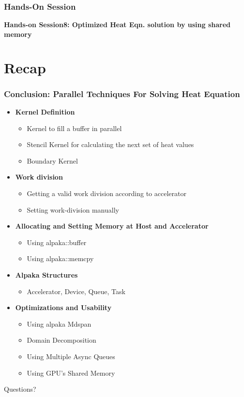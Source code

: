 \documentclass[9pt]{beamer}
\begin{document}
\begin{frame}
\frametitle{Hands-On Session}
\begin{center}
      \Huge \textbf{Hands-on Session8: Optimized Heat Eqn. solution by using shared memory}
  \end{center}
\end{frame}


\section{Recap}

\begin{frame}
\frametitle{Conclusion: Parallel Techniques For Solving Heat Equation}
\begin{itemize}
    \item \textbf{Kernel Definition}
    \begin{itemize}
        \item Kernel to fill a buffer in parallel
        \item Stencil Kernel for calculating the next set of heat values
        \item Boundary Kernel
    \end{itemize}
    \item \textbf{Work division}
    \begin{itemize}
        \item Getting a valid work division according to accelerator
        \item Setting work-division manually
    \end{itemize}
    \item \textbf{Allocating and Setting Memory at Host and Accelerator }
    \begin{itemize}
        \item Using alpaka::buffer
        \item Using alpaka::memcpy
    \end{itemize}
    \item \textbf{Alpaka Structures}
    \begin{itemize}
        \item Accelerator, Device, Queue, Task
    \end{itemize}
    \item \textbf{Optimizations and Usability}
    \begin{itemize}
        \item Using alpaka Mdspan
        \item Domain Decomposition
        \item Using Multiple Async Queues
        \item Using GPU's Shared Memory
    \end{itemize}
\end{itemize}
\end{frame}


\begin{frame}
\Huge{\centerline{Questions?}}
\end{frame}

\end{document}
